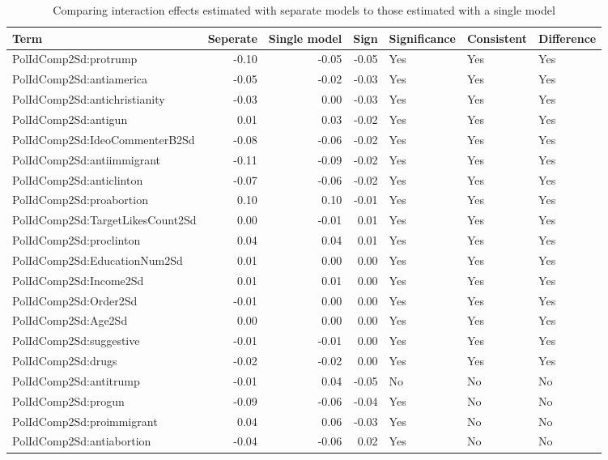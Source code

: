 \begin{table}[!h]
\centering
\caption{\label{tab:interaction-effects-comparison}Comparing interaction effects estimated with separate models to those estimated with a single model}
\centering
\begin{tabular}[t]{lrrrlll}
\toprule
Term & Seperate & Single model & Sign & Significance & Consistent & Difference\\
\midrule
PolIdComp2Sd:protrump & -0.10 & -0.05 & -0.05 & Yes & Yes & Yes\\
\cmidrule{1-7}
PolIdComp2Sd:antiamerica & -0.05 & -0.02 & -0.03 & Yes & Yes & Yes\\
\cmidrule{1-7}
PolIdComp2Sd:antichristianity & -0.03 & 0.00 & -0.03 & Yes & Yes & Yes\\
\cmidrule{1-7}
PolIdComp2Sd:antigun & 0.01 & 0.03 & -0.02 & Yes & Yes & Yes\\
\cmidrule{1-7}
PolIdComp2Sd:IdeoCommenterB2Sd & -0.08 & -0.06 & -0.02 & Yes & Yes & Yes\\
\cmidrule{1-7}
PolIdComp2Sd:antiimmigrant & -0.11 & -0.09 & -0.02 & Yes & Yes & Yes\\
\cmidrule{1-7}
PolIdComp2Sd:anticlinton & -0.07 & -0.06 & -0.02 & Yes & Yes & Yes\\
\cmidrule{1-7}
PolIdComp2Sd:proabortion & 0.10 & 0.10 & -0.01 & Yes & Yes & Yes\\
\cmidrule{1-7}
PolIdComp2Sd:TargetLikesCount2Sd & 0.00 & -0.01 & 0.01 & Yes & Yes & Yes\\
\cmidrule{1-7}
PolIdComp2Sd:proclinton & 0.04 & 0.04 & 0.01 & Yes & Yes & Yes\\
\cmidrule{1-7}
PolIdComp2Sd:EducationNum2Sd & 0.01 & 0.00 & 0.00 & Yes & Yes & Yes\\
\cmidrule{1-7}
PolIdComp2Sd:Income2Sd & 0.01 & 0.01 & 0.00 & Yes & Yes & Yes\\
\cmidrule{1-7}
PolIdComp2Sd:Order2Sd & -0.01 & 0.00 & 0.00 & Yes & Yes & Yes\\
\cmidrule{1-7}
PolIdComp2Sd:Age2Sd & 0.00 & 0.00 & 0.00 & Yes & Yes & Yes\\
\cmidrule{1-7}
PolIdComp2Sd:suggestive & -0.01 & -0.01 & 0.00 & Yes & Yes & Yes\\
\cmidrule{1-7}
PolIdComp2Sd:drugs & -0.02 & -0.02 & 0.00 & Yes & Yes & Yes\\
\cmidrule{1-7}
PolIdComp2Sd:antitrump & -0.01 & 0.04 & -0.05 & No & No & No\\
\cmidrule{1-7}
PolIdComp2Sd:progun & -0.09 & -0.06 & -0.04 & Yes & No & No\\
\cmidrule{1-7}
PolIdComp2Sd:proimmigrant & 0.04 & 0.06 & -0.03 & Yes & No & No\\
\cmidrule{1-7}
PolIdComp2Sd:antiabortion & -0.04 & -0.06 & 0.02 & Yes & No & No\\
\bottomrule
\end{tabular}
\end{table}
